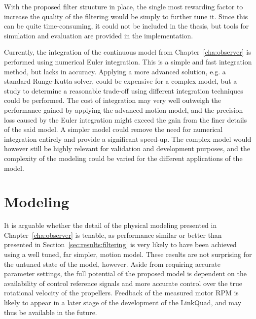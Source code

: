             With the proposed filter structure in place, the single
            most rewarding factor to increase the quality of the filtering
            would be simply to further tune it. Since this can be quite time-consuming,
            it could not be included in the thesis, but tools for simulation
            and evaluation are provided in the implementation.

            Currently, the integration of the continuous model from Chapter~\ref{cha:observer}
            is performed using numerical Euler integration.
            This is a simple and fast integration method, but lacks in accuracy.
            Applying a more advanced solution, e.g. a standard Runge-Kutta solver,
            could be expensive for a complex model, but a study to determine
            a reasonable trade-off using different integration techniques could be performed.
            The cost of integration may very well outweigh
            the performance gained by applying the advanced motion model,
            and the precision loss caused by the Euler integration might
            exceed the gain from the finer details of the said model.
            A simpler model could remove the need for numerical integration
            entirely and provide a significant speed-up. The complex model
            would however still be highly relevant for validation and
            development purposes, and the complexity of the modeling could
            be varied for the different applications of the model.

    \section{Modeling}
        It is arguable whether the detail of the physical modeling presented
        in Chapter~\ref{cha:observer} is tenable, as performance similar or better
        than presented in Section~\ref{sec:results:filtering} is very likely
        to have been achieved using a well tuned, far simpler, motion model.
        These results are not surprising for the untuned state of the model, however.
        Aside from requiring accurate parameter settings, the full potential of the
        proposed model is dependent on the availability of control reference
        signals and more accurate control over the true rotational velocity of
        the propellers. Feedback of the measured motor RPM is likely to appear in
        a later stage of the development of the LinkQuad, and may thus
        be available in the future.

